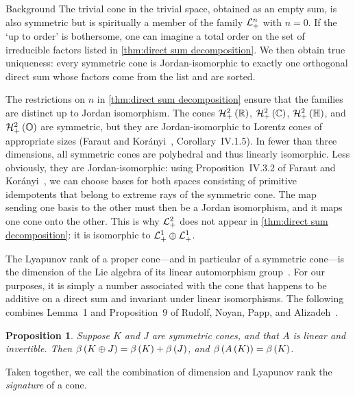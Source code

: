 \documentclass{interact}
\theoremstyle{plain}
\newtheorem{proposition}[theorem]{Proposition}
\theoremstyle{definition}
\theoremstyle{remark}
\begin{document}
\begin{section}{Background}
    The trivial cone in the trivial space, obtained as an empty sum,
    is also symmetric but is spiritually a member of the family
    $\Lnplus$ with $n=0$. If the `up to order' is bothersome, one
    can imagine a total order on the set of irreducible factors listed
    in \cref{thm:direct sum decomposition}. We then obtain true
    uniqueness: every symmetric cone is Jordan-isomorphic to exactly
    one orthogonal direct sum whose factors come from the list and are
    sorted.

    The restrictions on $n$ in \cref{thm:direct sum decomposition}
    ensure that the families are distinct up to Jordan isomorphism.
    The cones $\Hnplus[2]\of{\Rn[1]}$, $\Hnplus[2]\of{\Cn[1]}$,
    $\Hnplus[2]\of{\quaternions}$, and $\Hnplus[2]\of{\octonions}$ are
    symmetric, but they are Jordan-isomorphic to Lorentz cones of
    appropriate sizes (Faraut and Korányi~\cite{faraut-koranyi},
    Corollary~IV.1.5). In fewer than three dimensions, all symmetric
    cones are polyhedral and thus linearly isomorphic. Less obviously,
    they are Jordan-isomorphic: using Proposition~IV.3.2 of Faraut and
    Korányi~\cite{faraut-koranyi}, we can choose bases for both spaces
    consisting of primitive idempotents that belong to extreme rays of
    the symmetric cone. The map sending one basis to the other must
    then be a Jordan isomorphism, and it maps one cone onto the
    other. This is why $\Lnplus[2]$ does not appear in
    \cref{thm:direct sum decomposition}: it is isomorphic to
    $\directsum{\Lnplus[1]}{\Lnplus[1]}$.

    The Lyapunov rank of a proper cone---and in particular of a
    symmetric cone---is the dimension of the Lie algebra of its linear
    automorphism group~\cite{gowda-tao_-_rank}. For our purposes, it
    is simply a number associated with the cone that happens to be
    additive on a direct sum and invariant under linear
    isomorphisms. The following combines Lemma~1 and Proposition~9 of
    Rudolf, Noyan, Papp, and
    Alizadeh~\cite{rudolf-noyan-papp-alizadeh}.

    \begin{proposition}\label{prop:lyapunov rank is additive on direct sums}
      Suppose $K$ and $J$ are symmetric cones, and that $A$ is linear
      and invertible. Then $\lyapunovrank{\directsum{K}{J}} =
      \lyapunovrank{K} + \lyapunovrank{J}$, and $\lyapunovrank{A\of{K}}
        = \lyapunovrank{K}$.
    \end{proposition}

    Taken together, we call the combination of dimension and Lyapunov
    rank the \emph{signature} of a cone.


\end{section}
\end{document}
